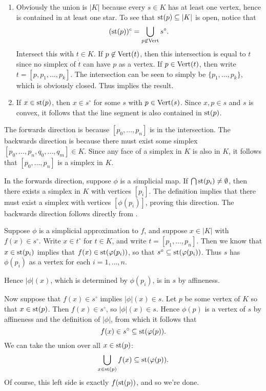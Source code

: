 \documentclass[../../solutions.tex]{subfiles}
\begin{document}
\begin{exercise} \leavevmode
\begin{enumerate}
\item
Obviously the union is $|K|$ because every $s\in K$ has at least one vertex, hence is contained in at least one star.
To see that $\operatorname{st}(p)\subseteq|K|$ is open, notice that
\[(\operatorname{st}(p))^c=\bigcup_{p\not\in\operatorname{Vert}}s^\circ.\]
Intersect this with $t\in K$.
If $p\not\in\operatorname{Vert}(t)$, then this intersection is equal to $t$ since no simplex of $\dot t$ can have $p$ as a vertex.
If $p\in\operatorname{Vert}(t)$, then write $t=[p,p_1,\dots,p_k]$.
The intersection can be seen to simply be $\{p_1,\dots,p_k\}$, which is obviously closed.
Thus  implies the result.

\item
If $x\in\operatorname{st}(p)$, then $x\in s^\circ$ for some $s$ with $p\in\operatorname{Vert}(s)$.
Since $x,p\in s$ and $s$ is convex, it follows that the line segment is also contained in $\operatorname{st}(p)$.
\end{enumerate}
\end{exercise}

\begin{exercise} \leavevmode
The forwards direction is because $[p_0,\dots,p_n]$ is in the intersection.
The backwards direction is because there must exist some simplex $[p_0,\dots,p_n,q_0,\dots,q_m]\in K$.
Since any face of a simplex in $K$ is also in $K$, it follows that $[p_0,\dots,p_n]$ is a simplex in $K$.
\end{exercise}

\begin{exercise} \leavevmode
In the forwards direction, suppose $\phi$ is a simplicial map.
If $\bigcap\operatorname{st}(p_i)\ne\emptyset$, then there exists a simplex in $K$ with vertices $[p_i]$.
The definition implies that there must exist a simplex with vertices $[\phi(p_i)]$, proving this direction.
The backwards direction follows directly from .
\end{exercise}

\begin{exercise} \leavevmode
Suppose $\phi$ is a simplicial approximation to $f$, and suppose $x\in|K|$ with $f(x)\in s^\circ$.
Write $x\in t^\circ$ for $t\in K$, and write $t=[p_1,\dots,p_n]$.
Then we know that $x\in\operatorname{st}(p_i)$ implies that $f(x)\in\operatorname{st}(\varphi(p_i))$, so that $s^\circ\subseteq\operatorname{st}(\varphi(p_i))$.
Thus $s$ has $\phi(p_i)$ as a vertex for each $i=1,\dots,n$.

Hence $|\phi|(x)$, which is determined by $\phi(p_i)$, is in $s$ by affineness.

Now suppose that $f(x)\in s^\circ$ implies $|\phi|(x)\in s$.
Let $p$ be some vertex of $K$ so that $x\in\operatorname{st}(p)$.
Then $f(x)\in s^\circ$, so $|\phi|(x)\in s$.
Hence $\phi(p)$ is a vertex of $s$ by affineness and the definition of $|\phi|$, from which it follows that
\[f(x)\in s^\circ\subseteq\operatorname{st}(\varphi(p)).\]
We can take the union over all $x\in\operatorname{st}(p)$:
\[\bigcup_{x\in\operatorname{st}(p)}f(x)\subseteq\operatorname{st}(\varphi(p)).\]
Of course, this left side is exactly $f(\operatorname{st}(p))$, and so we're done.
\end{exercise}
\end{document}
